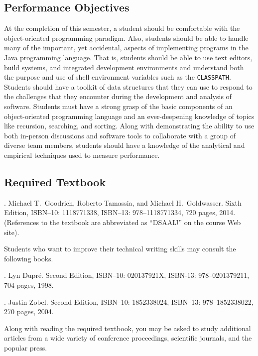 \documentclass[11pt]{article}
\begin{document}
\subsection*{Performance Objectives}

At the completion of this semester, a student should be comfortable with the object-oriented programming paradigm. Also,
students should be able to handle many of the important, yet accidental, aspects of implementing programs in the Java
programming language. That is, students should be able to use text editors, build systems, and integrated development
environments and understand both the purpose and use of shell environment variables such as the {\tt CLASSPATH}.
Students should have a toolkit of data structures that they can use to respond to the challenges that they encounter
during the development and analysis of software. Students must have a strong grasp of the basic components of an
object-oriented programming language and an ever-deepening knowledge of topics like recursion, searching, and sorting.
Along with demonstrating the ability to use both in-person discussions and software tools to collaborate with a group of
diverse team members, students should have a knowledge of the analytical and empirical techniques used to measure
performance.

\subsection*{Required Textbook}

. Michael T.\ Goodrich, Roberto Tamassia, and Michael H.\
Goldwasser. Sixth Edition, ISBN--10: 1118771338, ISBN--13: 978--1118771334, 720 pages, 2014. \\ (References to the
textbook are abbreviated as ``DSAAIJ'' on the course Web site).

\noindent
Students who want to improve their technical writing skills may consult the following books.

. Lyn Dupr\'e. Second Edition,  ISBN--10: 020137921X,
ISBN-13: 978--0201379211, 704 pages, 1998.

. Justin Zobel. Second Edition,  ISBN--10: 1852338024, ISBN--13:
978--1852338022, 270 pages, 2004.

\noindent Along with reading the required textbook, you may be asked to study additional articles from a wide variety of
conference proceedings, scientific journals, and the popular press.
\end{document}
